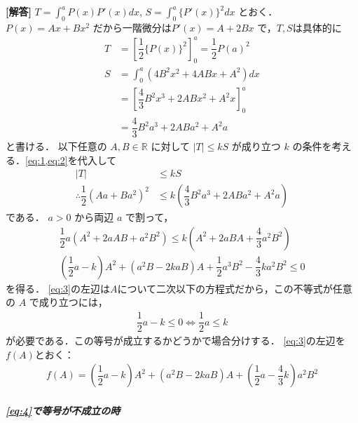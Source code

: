 \documentclass[../../main.tex]{subfiles}
\begin{document}
\begin{oframed}
  
\end{oframed}

{\bf [解答]}
$T = \displaystyle\int_0^a P(x)P'(x)dx$, $S = \displaystyle\int_0^a \{P'(x)\}^2 dx$ とおく．
$P(x)=Ax+Bx^2$ だから一階微分は$P'(x)=A+2Bx$ で，$T, S$は具体的に
\begin{align}
  T &= \left[\dfrac{1}{2}\{P(x)\}^2\right]_0^a = \dfrac{1}{2}P(a)^2 \label{eq:1}\\
  S &= \int_0^a (4B^2x^2+4ABx+A^2)dx \\
  &= \left[\dfrac{4}{3}B^2x^3+2ABx^2+A^2x\right]_0^a \\
  &= \dfrac{4}{3}B^2a^3+2ABa^2+A^2a \label{eq:2}
\end{align}
と書ける．
以下任意の $A,B\in\mathbb{R}$ に対して $|T|\le kS$ が成り立つ $k$ の条件を考える．\cref{eq:1,eq:2}を代入して
\begin{align}
  |T| & \le kS \\
  \therefore
  \dfrac{1}{2}(Aa+Ba^2)^2 & \le k\left(\dfrac{4}{3}B^2a^3+2ABa^2+A^2a\right)
\end{align}
である．
$a>0$ から両辺 $a$ で割って，
\begin{align}
  \dfrac{1}{2}a(A^2+2aAB+a^2B^2) \le k\left(A^2+2aBA+\dfrac{4}{3}a^2B^2\right) \\
  \left(\dfrac{1}{2}a-k\right)A^2 + (a^2B-2kaB)A + \dfrac{1}{2}a^3B^2 - \dfrac{4}{3}ka^2B^2 \le 0 \label{eq:3}
\end{align}
を得る．
\cref{eq:3}の左辺は$A$について二次以下の方程式だから，この不等式が任意の $A$ で成り立つには，
\begin{align}
  \dfrac{1}{2}a-k\le0 \iff \dfrac{1}{2}a\le k \label{eq:4}
\end{align}
が必要である．この等号が成立するかどうかで場合分けする．
\cref{eq:3}の左辺を$f(A)$とおく：
\begin{align}
  f(A) = \left(\dfrac{1}{2}a-k\right)A^2 + (a^2B-2kaB)A + \left(\dfrac{1}{2}a - \dfrac{4}{3}k\right)a^2B^2
\end{align}

\subparagraph{\cref{eq:4}で等号が不成立の時}
\end{document}
